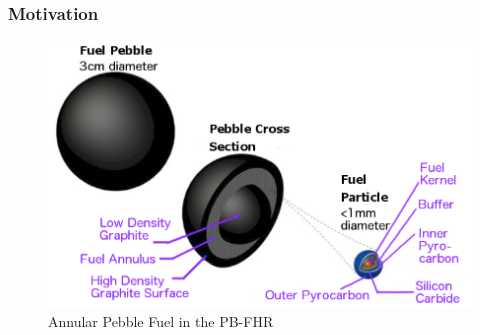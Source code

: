 \begin{frame}[fragile]
  \frametitle{Motivation}
  \begin{figure}[htbp!]
    \begin{center}
      \includegraphics[height=0.7\textheight]{./motivation/fhrpebbles.eps}
    \end{center}
    \caption{Annular Pebble Fuel in the PB-FHR}
    \label{fig:fuel}
  \end{figure}
\end{frame}
